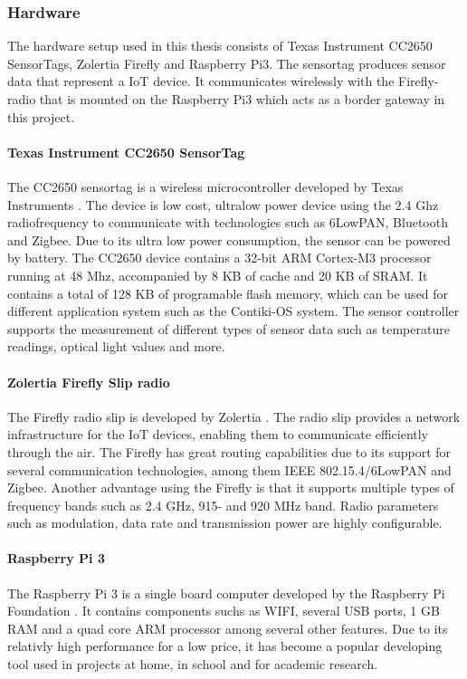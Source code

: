 \subsubsection{Hardware}
The hardware setup used in this thesis consists of Texas Instrument CC2650 SensorTags, Zolertia Firefly and Raspberry Pi3. The sensortag produces sensor data that represent a IoT device. It communicates wirelessly with the Firefly-radio that is mounted on the Raspberry Pi3 which acts as a border gateway in this project. 

\paragraph{Texas Instrument CC2650 SensorTag}
The CC2650 sensortag is a wireless microcontroller developed by Texas Instruments \cite{CC2650}. The device is low cost, ultralow power device using the 2.4 Ghz radiofrequency to communicate with technologies such as 6LowPAN, Bluetooth and Zigbee. Due to its ultra low power consumption, the sensor can be powered by battery.
The CC2650 device contains a 32-bit ARM Cortex-M3 processor running at 48 Mhz, accompanied by 8 KB of cache and 20 KB of SRAM. It contains a total of 128 KB of programable flash memory, which can be used for different application system such as the Contiki-OS system. The sensor controller supports the measurement of different types of sensor data such as temperature readings, optical light values and more. 


\paragraph{Zolertia Firefly Slip radio}
The Firefly radio slip is developed by Zolertia \cite{Firefly}. The radio slip provides a network infrastructure for the IoT devices, enabling them to communicate efficiently through the air. The Firefly has great routing capabilities due to its support for several communication technologies, among them IEEE 802.15.4/6LowPAN and Zigbee. Another advantage using the Firefly is that it supports multiple types of frequency bands such as 2.4 GHz, 915- and 920 MHz band. Radio parameters such as modulation, data rate and transmission power are highly configurable.

\paragraph{Raspberry Pi 3}
The Raspberry Pi 3 is a single board computer developed by the Raspberry Pi Foundation \cite{RP3}. It contains components suchs as WIFI, several USB ports, 1 GB RAM and a quad core ARM processor among several other features. Due to its relativly high performance for a low price, it has become a popular developing tool used in projects at home, in school and for academic research.